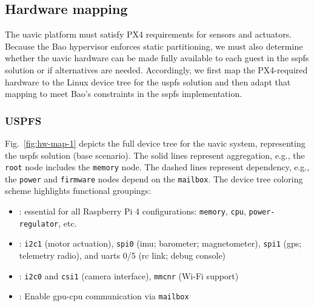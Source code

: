 

\subsection{Hardware mapping}
\label{sec:hardware-mapping}
The \gls{uavic} platform must satisfy PX4 requirements for sensors and
actuators. Because the Bao hypervisor enforces static partitioning, we must also
determine whether the \gls{uavic} hardware can be made fully available to each
guest in the \gls{sspfs} solution or if alternatives are needed.
Accordingly, we first map the PX4-required hardware to the Linux device tree for
the \gls{uspfs} solution and then adapt that mapping to meet Bao’s constraints in the \gls{sspfs} implementation.

\subsubsection{USPFS}
\label{sec:base-scenario}
Fig.~\ref{fig:hw-map-1} depicts the full device tree for the \gls{uavic} system,
representing the \gls{uspfs} solution (base scenario).
The solid lines represent aggregation, e.g., the \lstinline{root} node includes the \lstinline{memory} node. The
dashed lines represent dependency, e.g., the \lstinline{power} and \lstinline{firmware} nodes depend on the \lstinline{mailbox}.
%
The device tree coloring scheme highlights functional groupings:
\begin{itemize}
%
\item {}: essential for all Raspberry Pi
  4 configurations: \lstinline{memory}, \lstinline{cpu},
  \lstinline{power-regulator}, etc.
%
\item {}: \lstinline{i2c1} (motor
  actuation), \lstinline{spi0} (\gls{imu}; barometer; magnetometer),
  \lstinline{spi1} (\gls{gps}; telemetry radio), and \glspl{uart} 0/5 (\gls{rc}
  link; debug console)
%
\item {}: \lstinline{i2c0} and
  \lstinline{csi1} (camera interface), \lstinline{mmcnr} (Wi-Fi support)
%
\item {}: Enable \gls{gpu}-\gls{cpu} communication via \lstinline{mailbox}~\cite{rpi4-fw-mbox}
\end{itemize}

